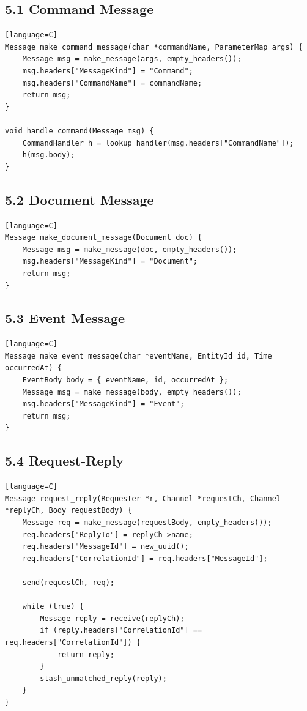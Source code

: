 \documentclass[11pt]{article}
\begin{document}
\subsection{5.1 Command Message}\label{command-message}

\begin{verbatim}[language=C]
Message make_command_message(char *commandName, ParameterMap args) {
    Message msg = make_message(args, empty_headers());
    msg.headers["MessageKind"] = "Command";
    msg.headers["CommandName"] = commandName;
    return msg;
}

void handle_command(Message msg) {
    CommandHandler h = lookup_handler(msg.headers["CommandName"]);
    h(msg.body);
}
\end{verbatim}

\subsection{5.2 Document Message}\label{document-message}

\begin{verbatim}[language=C]
Message make_document_message(Document doc) {
    Message msg = make_message(doc, empty_headers());
    msg.headers["MessageKind"] = "Document";
    return msg;
}
\end{verbatim}

\subsection{5.3 Event Message}\label{event-message}

\begin{verbatim}[language=C]
Message make_event_message(char *eventName, EntityId id, Time occurredAt) {
    EventBody body = { eventName, id, occurredAt };
    Message msg = make_message(body, empty_headers());
    msg.headers["MessageKind"] = "Event";
    return msg;
}
\end{verbatim}

\subsection{5.4 Request-Reply}\label{request-reply}

\begin{verbatim}[language=C]
Message request_reply(Requester *r, Channel *requestCh, Channel *replyCh, Body requestBody) {
    Message req = make_message(requestBody, empty_headers());
    req.headers["ReplyTo"] = replyCh->name;
    req.headers["MessageId"] = new_uuid();
    req.headers["CorrelationId"] = req.headers["MessageId"];

    send(requestCh, req);

    while (true) {
        Message reply = receive(replyCh);
        if (reply.headers["CorrelationId"] == req.headers["CorrelationId"]) {
            return reply;
        }
        stash_unmatched_reply(reply);
    }
}
\end{verbatim}
\end{document}
